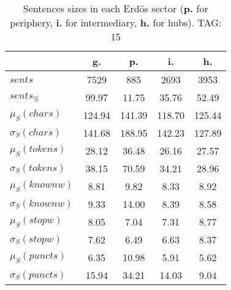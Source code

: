 \begin{table}[h!]
\begin{center}
\begin{tabular}{| l | c | c | c | c |}\hline
 & g. & p. & i. & h. \\\hline
$sents$ & 7529  & 885  & 2693  & 3953 \\\hline
$sents_{\%}$ & 99.97  & 11.75  & 35.76  & 52.49 \\\hline
$\mu_S(chars)$ & 124.94  & 141.39  & 118.70  & 125.44 \\\hline
$\sigma_S(chars)$ & 141.68  & 188.95  & 142.23  & 127.89 \\\hline
$\mu_S(tokens)$ & 28.12  & 36.48  & 26.16  & 27.57 \\\hline
$\sigma_S(tokens)$ & 38.15  & 70.59  & 34.21  & 28.96 \\\hline
$\mu_S(knownw)$ & 8.81  & 9.82  & 8.33  & 8.92 \\\hline
$\sigma_S(knownw)$ & 9.33  & 14.00  & 8.39  & 8.58 \\\hline
$\mu_S(stopw)$ & 8.05  & 7.04  & 7.31  & 8.77 \\\hline
$\sigma_S(stopw)$ & 7.62  & 6.49  & 6.63  & 8.37 \\\hline
$\mu_S(puncts)$ & 6.35  & 10.98  & 5.91  & 5.62 \\\hline
$\sigma_S(puncts)$ & 15.94  & 34.21  & 14.03  & 9.04 \\\hline
\end{tabular}
\caption{Sentences sizes in each Erd\"os sector ({{\bf p.}} for periphery, {{\bf i.}} for intermediary, {{\bf h.}} for hubs). TAG: 15}
\end{center}
\end{table}